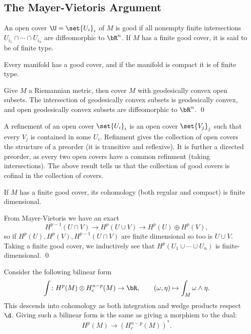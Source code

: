 \subsection{The Mayer-Vietoris Argument}

\bdefn

    An open cover $\U=\set{U_i}_i$ of $M$ is {\emphcolor good} if all nonempty finite intersections
    $U_{i_1}\cap\cdots\cap U_{i_n}$ are diffeomorphic to $\bR^n$.
    If $M$ has a finite good cover, it is said to be of {\emphcolor finite type}.

\edefn

\bprop

    Every manifold has a good cover, and if the manifold is compact it is of finite type.

\eprop

\bproof

    Give $M$ a Riemannian metric, then cover $M$ with geodesically convex open subsets.
    The intersection of geodesically convex subsets is geodesically convex, and open geodesically convex subsets are
    diffeomorphic to $\bR^n$.
    \qed

\eproof

A {\emphcolor refinement} of an open cover $\set{U_i}_i$ is an open cover $\set{V_j}_j$ such that every $V_j$ is contained
in some $U_i$.
Refinment gives the collection of open covers the structure of a preorder (it is transitive and reflexive).
It is further a directed preorder, as every two open covers have a common refinment (taking intersections).
The above result tells us that the collection of good covers is cofinal in the collection of covers.

\bprop

    If $M$ has a finite good cover, its cohomology (both regular and compact) is finite dimensional.

\eprop

\bproof

    From Mayer-Vietoris we have an exact
    $$ H^{p-1}(U\cap V) \to H^p(U\cup V) \to H^p(U)\oplus H^p(V) , $$
    so if $H^p(U),H^p(V),H^{p-1}(U\cap V)$ are finite dimensional so too is $U\cup V$.
    Taking a finite good cover, we inductively see that $H^p(U_1\cup\cdots\cup U_n)$ is finite-dimensional.
    \qed

\eproof

Consider the following bilinear form
$$ \int\colon H^p(M)\otimes H^{n-p}_c(M) \to \bR,\qquad (\omega,\eta)\mapsto\int_M\omega\wedge\eta . $$
This descends into cohomology as both integration and wedge products respect $\d$.
Giving such a bilinear form is the same as giving a morphism to the dual:
$$ H^p(M) \to (H^{n-p}_c(M))^* . $$

